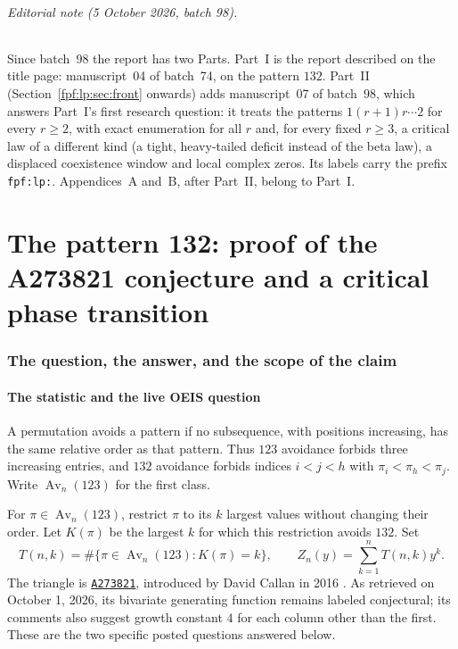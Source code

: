 \documentclass[11pt]{article}
\numberwithin{equation}{section}
\theoremstyle{definition}
\newcommand{\Av}{\operatorname{Av}}
\newcommand{\Oeis}[1]{\href{https://oeis.org/#1}{\texttt{#1}}}
\begin{document}
\paragraph{Editorial note (5 October 2026, batch 98).}
Since batch~98 the report has two Parts. Part~I is the report described on
the title page: manuscript~04 of batch~74, on the pattern $132$. Part~II
(Section~\ref{fpf:lp:sec:front} onwards) adds manuscript~07 of batch~98,
which answers Part~I's first research question: it treats the patterns
$1(r+1)r\cdots2$ for every $r\ge2$, with exact enumeration for all $r$ and,
for every fixed $r\ge3$, a critical law of a different kind (a tight,
heavy-tailed deficit instead of the beta law), a displaced coexistence
window and local complex zeros. Its labels carry the prefix
\texttt{fpf:lp:}. Appendices~A and~B, after Part~II, belong to Part~I.

\tableofcontents
\newpage

\part{The pattern 132: proof of the A273821 conjecture and a critical phase transition}

\section{The question, the answer, and the scope of the claim}\label{fpf:sec:question}

\subsection{The statistic and the live OEIS question}
A permutation avoids a pattern if no subsequence, with positions increasing,
has the same relative order as that pattern. Thus $123$ avoidance forbids
three increasing entries, and $132$ avoidance forbids indices $i<j<h$ with
$\pi_i<\pi_h<\pi_j$. Write $\Av_n(123)$ for the first class.

For $\pi\in\Av_n(123)$, restrict $\pi$ to its $k$ largest values without
changing their order. Let $K(\pi)$ be the largest $k$ for which this
restriction avoids $132$. Set
\begin{equation}\label{fpf:eq:definition}
 T(n,k)=\#\{\pi\in\Av_n(123):K(\pi)=k\},\qquad
 Z_n(y)=\sum_{k=1}^n T(n,k)y^k.
\end{equation}
The triangle is \Oeis{A273821}, introduced by David Callan in 2016
\cite{oeis273821}. As retrieved on October 1, 2026, its bivariate generating
function remains labeled conjectural; its comments also suggest growth
constant $4$ for each column other than the first. These are the two
specific posted questions answered below.
\end{document}
